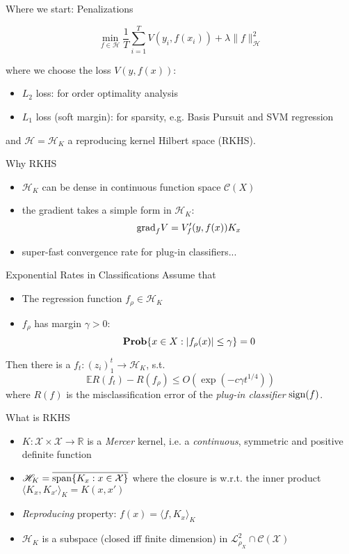 \documentclass[pdf,slideColor,colorBG]{prosper}
\theoremstyle{theorem}
\theoremstyle{definition}
\theoremstyle{remark}
\def\R{{\mathbb R}}        %
\def\<{{\langle}}
\def\>{{\rangle}}
\def\E{{\mathbb E}}        %
\def\L{{\mathscr L}}
\def\L2{{\mathscr L}^2_{\rho_X}}
\def\C{{\mathscr C}}
\def\H{{\mathscr H}}
\def\X{{\mathcal X}}
\def\Prob{{\bf Prob}}
\def\grad{{\rm grad}}
\def\sign{{\rm sign}}
\def\span{{\rm span}}
\begin{document}
%
\begin{slide}{Where we start: Penalizations}

\[ \min_{f\in \H} \frac{1}{T} \sum_{i=1}^T V(y_i,f(x_i)) + \lambda \|f\|_\H^2 \]

where we choose the loss $V(y,f(x))$:
\begin{itemize}
        \item $L_2$ loss: for order optimality analysis
        \item $L_1$ loss (soft margin): for sparsity, e.g. Basis Pursuit and SVM regression
\end{itemize}

\medskip
and $\H=\H_K$ a reproducing kernel Hilbert space (RKHS).
\end{slide}

%
\begin{slide}{Why RKHS}

\begin{itemize}
        \item $\H_K$ can be dense in continuous function space $\C(X)$
        \item the gradient takes a simple form in $\H_K$:
        $$\grad_f V = V'_f(y,f(x)) K_x $$
        \item super-fast convergence rate for plug-in classifiers...
\end{itemize}
\end{slide}

%
\begin{slide}{Exponential Rates in Classifications}
Assume that
\begin{itemize}
        \item The regression function $f_\rho \in \H_K$
        \item $f_\rho$ has margin $\gamma>0$:
        $$ \Prob\{x\in X: |f_\rho(x)|\leq \gamma\}=0 $$
\end{itemize}
Then there is a $f_t:(z_i)_1^t \to \H_K$, s.t.
\[ \E R(f_t) - R(f_\rho) \leq O(\exp ( - c \gamma t^{1/4})) \]
where $R(f)$ is the misclassification error of the \emph{plug-in classifier} $\sign(f)$.
\end{slide}

%
\begin{slide}{What is RKHS}
\begin{itemize}
    \item $K:\X\times\X\to \R$ is a \emph{Mercer} kernel, i.e. a \emph{continuous}, symmetric and positive definite function
    \item $\H_K=\overline{\span\{K_x:x\in \X\}}$ where the closure is w.r.t. the inner product $\<K_x,K_{x'}\>_K = K(x,x')$
    \item \emph{Reproducing} property: $f(x)=\<f,K_x\>_K$
    \item $\H_K$ is a subspace (closed iff finite dimension) in $\L2\cap \C(\X)$
\end{itemize}
\end{slide}
\end{document}
